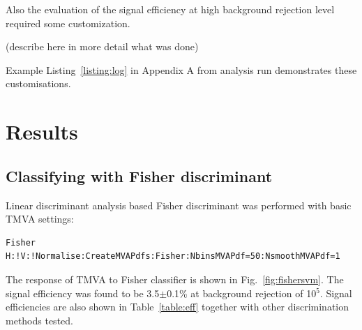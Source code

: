 \documentclass[a4paper]{jpconf}
\begin{document}
Also the evaluation of the signal efficiency at high background rejection
level required some customization.

(describe here in more detail what was done)

Example Listing~\ref{listing:log} in Appendix A from analysis run demonstrates these customisations.


\section{Results}\label{sec:results}

\subsection{Classifying with Fisher discriminant}
Linear discriminant analysis  based Fisher discriminant
was performed with basic TMVA settings:

\begin{verbatim}
Fisher H:!V:!Normalise:CreateMVAPdfs:Fisher:NbinsMVAPdf=50:NsmoothMVAPdf=1
\end{verbatim}

The response of TMVA to Fisher classifier is shown in Fig.~\ref{fig:fishersvm}. 
The signal efficiency was found to be 3.5$\pm$0.1\% at background rejection of 10$^5$.
Signal efficiencies are also shown in Table~\ref{table:eff} together with other discrimination methods tested.
 
\end{document}
